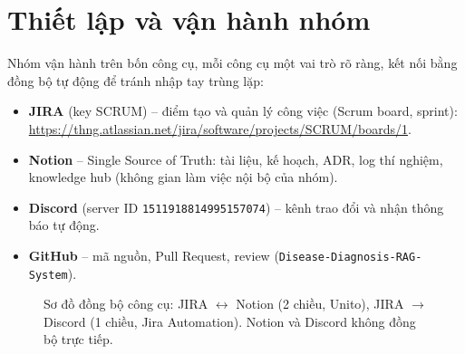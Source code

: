 \section{Thiết lập và vận hành nhóm}
Nhóm vận hành trên bốn công cụ, mỗi công cụ một vai trò rõ ràng, kết nối bằng đồng bộ tự động để tránh nhập tay trùng lặp:
\begin{itemize}
    \item \textbf{JIRA} (key SCRUM) -- điểm tạo và quản lý công việc (Scrum board, sprint): \url{https://thng.atlassian.net/jira/software/projects/SCRUM/boards/1}.
    \item \textbf{Notion} -- Single Source of Truth: tài liệu, kế hoạch, ADR, log thí nghiệm, knowledge hub (không gian làm việc nội bộ của nhóm).
    \item \textbf{Discord} (server ID \texttt{1511918814995157074}) -- kênh trao đổi và nhận thông báo tự động.
    \item \textbf{GitHub} -- mã nguồn, Pull Request, review (\texttt{Disease-Diagnosis-RAG-System}).
\end{itemize}

\begin{figure}[H]
    \centering
    \caption{Sơ đồ đồng bộ công cụ: JIRA $\leftrightarrow$ Notion (2 chiều, Unito), JIRA $\rightarrow$ Discord (1 chiều, Jira Automation). Notion và Discord không đồng bộ trực tiếp.}
    \label{fig:toolchain}
\end{figure}

